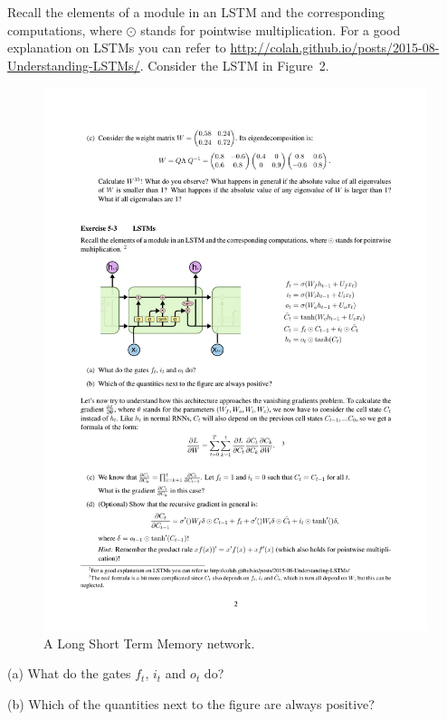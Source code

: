 \documentclass[12pt]{article}
\begin{document}
 \noindent Recall the elements of a module in an LSTM and the corresponding computations, where $\odot$ stands for pointwise multiplication. For a good explanation on LSTMs you can refer to \url{http://colah.github.io/posts/2015-08-Understanding-LSTMs/}. Consider the LSTM in Figure~2.
 \begin{figure}[!t]
\label{fig:lstms}
\centering
\includegraphics[scale=1.0]{lstm}
\vspace{-1em}
\caption{A Long Short Term Memory network.}
\end{figure}
 
 (a) What do the gates $f_t$, $i_t$ and $o_t$ do?
 
 (b) Which of the quantities next to the figure are always positive?
 
\end{document}
